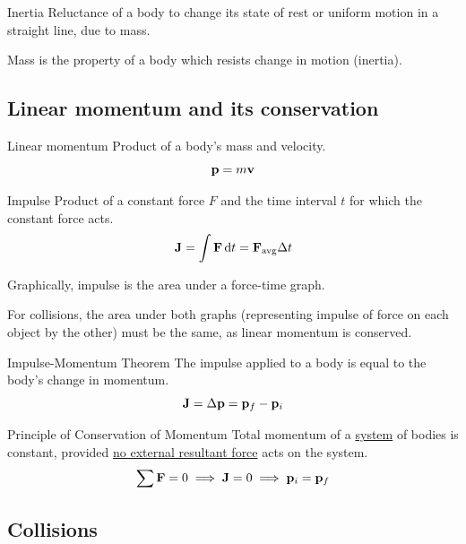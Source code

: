\begin{defn}{Inertia}{}
Reluctance of a body to change its state of rest or uniform motion in a straight line, due to mass. 
\end{defn} 
\begin{remark}
Mass is the property of a body which resists change in motion (inertia).
\end{remark}
\pagebreak

\subsection{Linear momentum and its conservation}
\begin{defn}{Linear momentum}{}
Product of a body's mass and velocity. 
\begin{equation}
\vb{p} = m\vb{v}
\end{equation}
\end{defn} 

\begin{defn}{Impulse}{}
Product of a constant force $F$ and the time interval $t$ for which the constant force acts. 
\begin{equation} 
\vb{J} = \int\vb{F}\dd{t} = \vb{F}_{\mathrm{avg}} \Delta t \end{equation}
\end{defn} 
Graphically, impulse is the area under a force-time graph. 

For collisions, the area under both graphs (representing impulse of force on each object by the other) must be the same, as linear momentum is conserved.

\begin{defn}{Impulse-Momentum Theorem}{}
The impulse applied to a body is equal to the body's change in momentum.
\begin{equation}
\vb{J} = \Delta\vb{p} = \vb{p}_f-\vb{p}_i
\end{equation}
\end{defn} 

\begin{defn}{Principle of Conservation of Momentum}{}
Total momentum of a \underline{system} of bodies is constant, provided \underline{no external resultant force} acts on the system.
\begin{equation}
\sum \vb{F} = 0 \implies \vb{J} = 0 \implies \vb{p}_i=\vb{p}_f
\end{equation}
\end{defn} 
\pagebreak

\subsection{Collisions}
